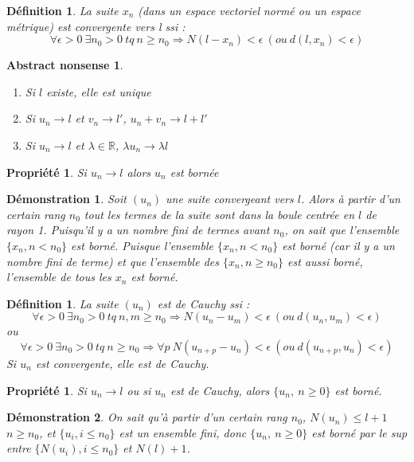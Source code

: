 \documentclass[a4paper, oneside]{report}
\theoremstyle{break}
\newtheorem{defi}[thm]{Définition}
\newtheorem{propr}[thm]{Propriété}
\newtheorem*{demo}{Démonstration}
\newtheorem*{absnon}{Abstract nonsense}
\newcommand{\R}{\mathbb{R}}
\newcommand{\ev}{espace vectoriel }
\begin{document}
\begin{defi}                    
La suite $x_n$ (dans un \ev normé ou un espace métrique) est convergente vers l ssi :
$$\forall \epsilon >0~ \exists n_0>0~tq~n\geq n_0 \Rightarrow N(l-x_n)<\epsilon~(ou~d(l,x_n)<\epsilon)$$
\end{defi}


\begin{absnon}
\begin{enumerate}
\item Si $l$ existe, elle est unique
\item Si $u_n \rightarrow l$ et $v_n\rightarrow l'$, $u_n+v_n \rightarrow l+l'$
\item Si $u_n \rightarrow l$ et $\lambda \in \R$, $\lambda u_n \rightarrow \lambda l$
\end{enumerate}
\end{absnon}


\begin{propr}
Si $u_n\rightarrow l$ alors $u_n$ est bornée
\end{propr}


\begin{demo}
Soit $(u_n)$ une suite convergeant vers $l$.
Alors à partir d'un certain rang $n_0$ tout les termes de la suite sont dans la boule centrée en $l$ de rayon 1.
Puisqu'il y a un nombre fini de termes avant $n_0$, on sait que l'ensemble $\{x_n, n < n_0\}$ est borné.
Puisque l'ensemble $\{x_n,  n < n_0\}$ est borné (car il y a un nombre fini de terme) et que l'ensemble des $\{x_n,  n \geq n_0\}$ est aussi borné, l'ensemble de tous les $x_n$ est borné.
\end{demo}


\begin{defi}                    

La suite $(u_n)$ est de Cauchy ssi :
$$\forall \epsilon >0~ \exists n_0>0~tq~n,m\geq n_0 \Rightarrow N(u_n-u_m)<\epsilon~(ou~d(u_n,u_m)<\epsilon)$$
ou 
$$\forall \epsilon >0~ \exists n_0>0~tq~n\geq n_0 \Rightarrow \forall p~N(u_{n+p}-u_n)<\epsilon~(ou~d(u_{n+p},u_n)<\epsilon)$$
Si $u_n$ est convergente, elle est de Cauchy.
\end{defi}

\begin{propr}

Si $u_n \rightarrow l$ ou si $u_n$ est de Cauchy, alors $\{u_n,~n\geq 0 \}$ est borné.
\end{propr}


\begin{demo}
On sait qu'à partir d'un certain rang $n_0$, $N(u_n) \leq l+1$ $n\geq n_0$, et $\{u_i, i\leq n_0 \}$ est un ensemble fini, donc $\{u_n,~n\geq 0 \}$ est borné par le sup entre $\{N(u_i), i\leq n_0 \}$ et $N(l)+1$.
\end{demo}
\end{document}
